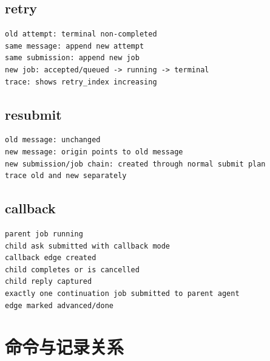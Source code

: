 \subsection{retry}

\begin{Verbatim}[fontsize=\small,frame=single]
old attempt: terminal non-completed
same message: append new attempt
same submission: append new job
new job: accepted/queued -> running -> terminal
trace: shows retry_index increasing
\end{Verbatim}

\subsection{resubmit}

\begin{Verbatim}[fontsize=\small,frame=single]
old message: unchanged
new message: origin points to old message
new submission/job chain: created through normal submit plan
trace old and new separately
\end{Verbatim}

\subsection{callback}

\begin{Verbatim}[fontsize=\small,frame=single]
parent job running
child ask submitted with callback mode
callback edge created
child completes or is cancelled
child reply captured
exactly one continuation job submitted to parent agent
edge marked advanced/done
\end{Verbatim}

\section{命令与记录关系}

